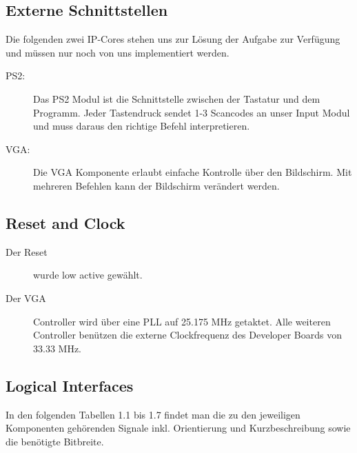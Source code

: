 \subsection{Externe Schnittstellen}
Die folgenden zwei IP-Cores stehen uns zur Lösung der Aufgabe zur Verfügung und müssen nur noch von uns implementiert werden.
\begin{description}
 \item[PS2:] Das PS2 Modul ist die Schnittstelle zwischen der Tastatur und dem Programm. Jeder Tastendruck sendet 1-3 
Scancodes an unser Input Modul und muss daraus den richtige Befehl interpretieren.
 \item[VGA:] Die VGA Komponente erlaubt einfache Kontrolle über den Bildschirm. Mit mehreren Befehlen kann der Bildschirm
verändert werden.
 \end{description}

\subsection{Reset and Clock}
\begin{description}
\item[Der Reset] wurde low active gewählt.

\item[Der VGA] Controller wird über eine PLL auf 25.175 MHz getaktet. 
Alle weiteren Controller benützen die externe Clockfrequenz
des Developer Boards von 33.33 MHz.
 \end{description}


\subsection{Logical Interfaces}


In den folgenden Tabellen 1.1 bis 1.7 findet man die zu den jeweiligen
Komponenten gehörenden Signale inkl. Orientierung und Kurzbeschreibung 
sowie die benötigte Bitbreite.

